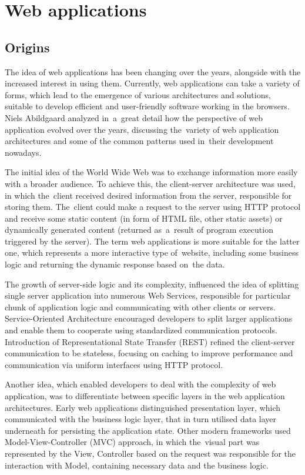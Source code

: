 \chapter{Web applications} \label{chapter:web-apps}

\section{Origins}

The idea of web applications has been changing over the years, alongside with the increased interest in using them. Currently, web applications can take a variety of forms, which lead to the emergence of various architectures and solutions, suitable to develop efficient and user-friendly software working in the browsers. Niels Abildgaard \cite{PerspectivesOnArchitectureEvolution} analyzed in~a~great detail how the perspective of web application evolved over the years, discussing the~variety of web application architectures and some of the common patterns used in~their development nowadays.

The initial idea of the World Wide Web was to exchange information more easily with a broader audience. To achieve this, the client-server architecture was used, in which the~client received desired information from the server, responsible for storing them. The~client could make a request to the server using HTTP protocol and receive some static content (in form of HTML file, other static assets) or dynamically generated content (returned as~a~result of program execution triggered by the server). The term web applications is more suitable for the latter one, which represents a more interactive type of~website, including some business logic and returning the dynamic response based on~the data.

The growth of server-side logic and its complexity, influenced the idea of splitting single server application into numerous Web Services, responsible for particular chunk of application logic and communicating with other clients or servers. Service-Oriented Architecture encouraged developers to split larger applications and enable them to cooperate using standardized communication protocols. Introduction of Representational State Transfer (REST) \cite{RESTPrincipledDesingOfModernWebArchitecture} refined the client-server communication to be stateless, focusing on caching to improve performance and communication via uniform interfaces using HTTP protocol.

Another idea, which enabled developers to deal with the complexity of web application, was to differentiate between specific layers in the web application architectures. Early web applications distinguished presentation layer, which communicated with the business logic layer, that in turn utilised data layer underneath for persisting the application state. Other modern frameworks used Model-View-Controller (MVC) approach, in which the~visual part was represented by the View, Controller based on the request was responsible for the interaction with Model, containing necessary data and the business logic.

